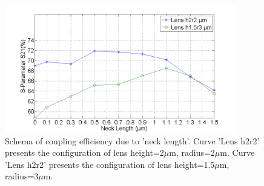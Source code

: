 \begin{figure}[!ht]
\centering
\includegraphics[width=0.9\textwidth]{bilder/s21_neck}
\caption {Schema of coupling efficiency due to 'neck length'. Curve 'Lens h2r2' presents the configuration of lens height=2$\mu$m, radius=2$\mu$m. Curve 'Lens h2r2' presents the configuration of lens height=1.5$\mu$m, radius=3$\mu$m.}
\label{fig:s21_neck}
\end{figure}
